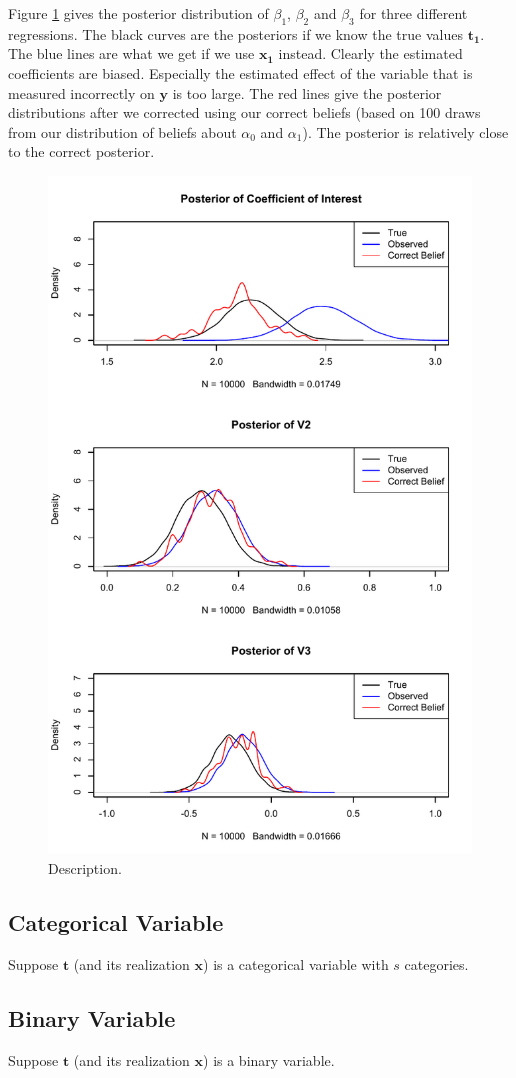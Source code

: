 \documentclass[fignum,letterpaper,12pt]{article}
\begin{document}
Figure \ref{coefplot} gives the posterior distribution of $\beta_1$, $\beta_2$ and $\beta_3$ for three different regressions. The black curves are the posteriors if we know the true values $\mathbf{t_1}$. The blue lines are what we get if we use $\mathbf{x_1}$ instead. Clearly the estimated coefficients are biased. Especially the estimated effect of the variable that is measured incorrectly on $\mathbf{y}$ is too large. The red lines give the posterior distributions after we corrected using our correct beliefs (based on 100 draws from our distribution of beliefs about $\alpha_0$ and $\alpha_1$). The posterior is relatively close to the correct posterior. 


\begin{figure}
\begin{center}
\includegraphics[width=.65\textwidth]{coefplot.pdf} 
\caption{Description.}
\label{coefplot}
\end{center}
\end{figure}



\subsection{Categorical Variable}

Suppose $\mathbf{t}$ (and its realization $\mathbf{x}$) is a categorical variable with $s$ categories.


\subsection{Binary Variable}

Suppose $\mathbf{t}$ (and its realization $\mathbf{x}$) is a binary variable.
\end{document}
